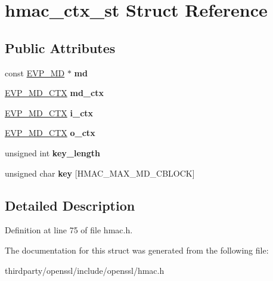 \hypertarget{structhmac__ctx__st}{}\section{hmac\+\_\+ctx\+\_\+st Struct Reference}
\label{structhmac__ctx__st}
\subsection*{Public Attributes}
\begin{DoxyCompactItemize}
\item 
\mbox{\label{structhmac__ctx__st_a9aaff763ed7d862ad49ffa19073deac5}} 
const \hyperlink{structenv__md__st}{E\+V\+P\+\_\+\+MD} $\ast$ {\bfseries md}
\item 
\mbox{\label{structhmac__ctx__st_a47d4d66a70519722df931e144dbc77a0}} 
\hyperlink{structenv__md__ctx__st}{E\+V\+P\+\_\+\+M\+D\+\_\+\+C\+TX} {\bfseries md\+\_\+ctx}
\item 
\mbox{\label{structhmac__ctx__st_aa702847295c2c2c40f6093936b89a829}} 
\hyperlink{structenv__md__ctx__st}{E\+V\+P\+\_\+\+M\+D\+\_\+\+C\+TX} {\bfseries i\+\_\+ctx}
\item 
\mbox{\label{structhmac__ctx__st_a9ac033d3f121ddbb6329e68825318ad8}} 
\hyperlink{structenv__md__ctx__st}{E\+V\+P\+\_\+\+M\+D\+\_\+\+C\+TX} {\bfseries o\+\_\+ctx}
\item 
\mbox{\label{structhmac__ctx__st_a7330fd76130fea0171458261bfc11226}} 
unsigned int {\bfseries key\+\_\+length}
\item 
\mbox{\label{structhmac__ctx__st_a67cdff832dfb8cf2bf7affb9634ef82a}} 
unsigned char {\bfseries key} \mbox{[}H\+M\+A\+C\+\_\+\+M\+A\+X\+\_\+\+M\+D\+\_\+\+C\+B\+L\+O\+CK\mbox{]}
\end{DoxyCompactItemize}


\subsection{Detailed Description}


Definition at line 75 of file hmac.\+h.



The documentation for this struct was generated from the following file\+:\begin{DoxyCompactItemize}
\item 
thirdparty/openssl/include/openssl/hmac.\+h\end{DoxyCompactItemize}
